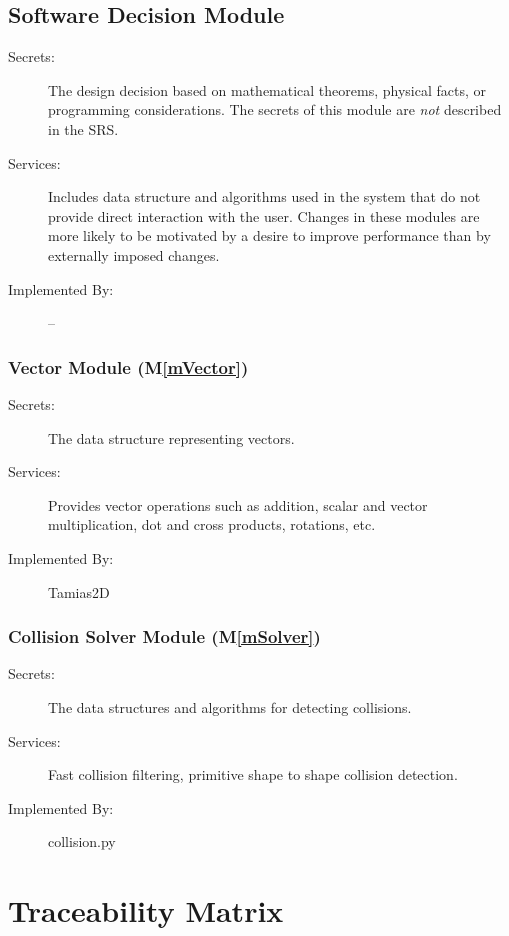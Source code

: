\documentclass[12pt]{article}
\newcommand{\mref}[1]{M\ref{#1}}
\newcommand{\progname}{Tamias2D}
\begin{document}
\subsection{Software Decision Module}

\begin{description}
\item[Secrets:] The design decision based on mathematical theorems, physical
  facts, or programming considerations. The secrets of this module are
  \emph{not} described in the SRS.
\item[Services:] Includes data structure and algorithms used in the system that do not provide direct interaction with the user. 
  Changes in these modules are more likely to be motivated by a desire to
  improve performance than by externally imposed changes.
\item[Implemented By:] -- {}
\end{description}

\subsubsection{Vector Module (\mref{mVector})}
	
\begin{description}
	\item[Secrets:] The data structure representing vectors.
	\item[Services:] Provides vector operations such as addition, scalar and vector multiplication, dot and cross products, rotations, etc.
	\item[Implemented By:] {\progname}
\end{description}


\subsubsection{Collision Solver Module (\mref{mSolver})}

\begin{description}
	\item[Secrets:] The data structures and algorithms for detecting collisions.
	\item[Services:] Fast collision filtering, primitive shape to shape collision detection.
	\item[Implemented By:] {collision.py}
\end{description}

\section{Traceability Matrix} \label{SecTM}
\end{document}
